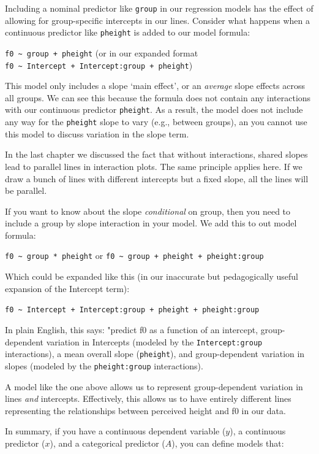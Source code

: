 \documentclass[
]{book}
\begin{document}
Including a nominal predictor like \texttt{group} in our regression models has the effect of allowing for group-specific intercepts in our lines. Consider what happens when a continuous predictor like \texttt{pheight} is added to our model formula:

\texttt{f0\ \textasciitilde{}\ group\ +\ pheight} (or in our expanded format \texttt{f0\ \textasciitilde{}\ Intercept\ +\ Intercept:group\ +\ pheight})

This model only includes a slope `main effect', or an \emph{average} slope effects across all groups. We can see this because the formula does not contain any interactions with our continuous predictor \texttt{pheight}. As a result, the model does not include any way for the \texttt{pheight} slope to vary (e.g., between groups), an you cannot use this model to discuss variation in the slope term.

In the last chapter we discussed the fact that without interactions, shared slopes lead to parallel lines in interaction plots. The same principle applies here. If we draw a bunch of lines with different intercepts but a fixed slope, all the lines will be parallel.

If you want to know about the slope \emph{conditional} on group, then you need to include a group by slope interaction in your model. We add this to out model formula:

\texttt{f0\ \textasciitilde{}\ group\ *\ pheight} or \texttt{f0\ \textasciitilde{}\ group\ +\ pheight\ +\ pheight:group}

Which could be expanded like this (in our inaccurate but pedagogically useful expansion of the Intercept term):

\texttt{f0\ \textasciitilde{}\ Intercept\ +\ Intercept:group\ +\ pheight\ +\ pheight:group}

In plain English, this says: "predict f0 as a function of an intercept, group-dependent variation in Intercepts (modeled by the \texttt{Intercept:group} interactions), a mean overall slope (\texttt{pheight}), and group-dependent variation in slopes (modeled by the \texttt{pheight:group} interactions).

A model like the one above allows us to represent group-dependent variation in lines \emph{and} intercepts. Effectively, this allows us to have entirely different lines representing the relationships between perceived height and f0 in our data.

In summary, if you have a continuous dependent variable (\(y\)), a continuous predictor (\(x\)), and a categorical predictor (\(A\)), you can define models that:
\end{document}
